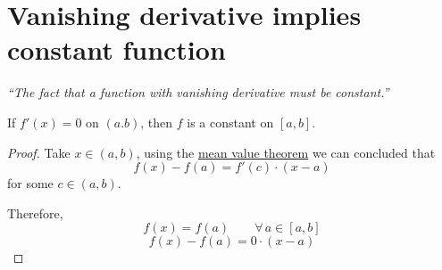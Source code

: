 \documentclass[12pt]{report}
\begin{document}
    \section{Vanishing derivative implies constant function}
    \textit{``The fact that a function with vanishing derivative must be constant.''} \vspace{3mm}
    \begin{theorem}
        If \(f'(x) = 0\) on \((a.b)\), then \(f\) is a constant on \([a,b]\).
    \end{theorem}
    \begin{proof}
        Take \(x \in (a,b)\), using the \hyperref[Mean value theorem]{mean value theorem} we can concluded that
        \[f(x) - f(a) = f'(c) \cdot (x-a)\]
        for some \(c \in (a,b)\).

        Therefore,
        \[f(x) = f(a) \qquad \forall \, a \in [a,b]\]
        \[f(x) - f(a) = 0 \cdot (x-a)\]
    \end{proof}
    \setcounter{section}{11}
\end{document}
